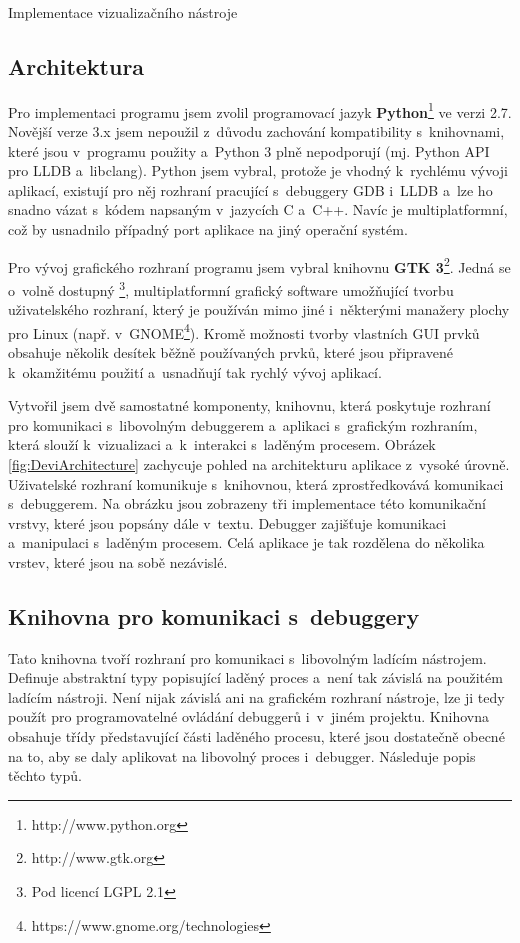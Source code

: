 \documentclass[czech,bachelor,male,python,dept460,hidelinks]{diploma}						%
\newcommand{\parspace}[1][]{
	\ifthenelse{\isempty{#1}}{\vspace{0mm}}{\vspace{#1}}
	\par
}
\begin{document}
\begin{section}{Implementace vizualizačního nástroje}
	\subsection{Architektura}
	\par Pro implementaci programu jsem zvolil programovací jazyk \textbf{Python}\footnote{http://www.python.org} ve verzi 2.7. Novější verze 3.x jsem nepoužil
	z~důvodu zachování kompatibility s~knihovnami, které jsou v~programu použity a~Python 3 plně nepodporují (mj. Python API pro LLDB a~libclang).
	Python jsem vybral, protože je vhodný k~rychlému vývoji aplikací, existují pro něj rozhraní pracující s~debuggery GDB i~LLDB a~lze ho snadno vázat
	s~kódem napsaným v~jazycích C a~C++. Navíc je multiplatformní, což by usnadnilo případný port aplikace na jiný operační systém.
	
	\parspace Pro vývoj grafického rozhraní programu jsem vybral knihovnu \textbf{GTK 3}\footnote{http://www.gtk.org}. Jedná se o~volně dostupný
	\footnote{Pod licencí LGPL 2.1}, multiplatformní grafický software umožňující tvorbu uživatelského rozhraní, který je používán mimo jiné
	i~některými manažery plochy pro Linux (např. v~GNOME\footnote{https://www.gnome.org/technologies}). Kromě možnosti tvorby vlastních
	GUI prvků obsahuje několik desítek běžně používaných prvků, které jsou připravené k~okamžitému použití a~usnadňují tak rychlý vývoj aplikací.
	
	\parspace Vytvořil jsem dvě samostatné komponenty, knihovnu, která poskytuje rozhraní pro komunikaci s~libovolným debuggerem a~aplikaci s~grafickým rozhraním,
	která slouží k~vizualizaci a~k~interakci s~laděným procesem.
	Obrázek \ref{fig:DeviArchitecture} zachycuje pohled na architekturu aplikace z~vysoké úrovně.
	Uživatelské rozhraní komunikuje s~knihovnou, která zprostředkovává komunikaci s~debuggerem. Na obrázku jsou zobrazeny tři implementace této komunikační vrstvy,
	které jsou popsány dále v~textu. Debugger zajišťuje komunikaci a~manipulaci s~laděným procesem. Celá aplikace je tak rozdělena do několika
	vrstev, které jsou na sobě nezávislé.
	
		
	\subsection{Knihovna pro komunikaci s~debuggery}
	\label{sec:DebuggerApi}
		Tato knihovna tvoří rozhraní pro komunikaci s~libovolným ladícím nástrojem. Definuje abstraktní typy popisující laděný proces a~není tak závislá na
		použitém ladícím nástroji. Není nijak závislá ani na grafickém rozhraní nástroje, lze ji tedy použít pro programovatelné ovládání debuggerů i~v~jiném
		projektu. Knihovna obsahuje třídy představující části laděného procesu, které jsou dostatečně obecné na to, aby se daly aplikovat na libovolný
		proces i~debugger. Následuje popis těchto typů.
		

\end{section}
\end{document}
